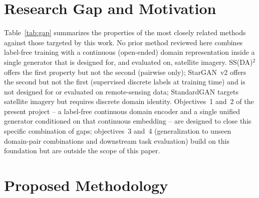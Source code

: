 \documentclass[runningheads]{llncs}
\begin{document}
\section{Research Gap and Motivation}
\label{sec:gap}
Table~\ref{tab:gap} summarizes the properties of the most closely related methods against those targeted by this work. No prior method reviewed here combines label-free training with a continuous (open-ended) domain representation inside a single generator that is designed for, and evaluated on, satellite imagery. SS(DA)$^2$ offers the first property but not the second (pairwise only); StarGAN~v2 offers the second but not the first (supervised discrete labels at training time) and is not designed for or evaluated on remote-sensing data; StandardGAN targets satellite imagery but requires discrete domain identity. Objectives~1 and~2 of the present project -- a label-free continuous domain encoder and a single unified generator conditioned on that continuous embedding -- are designed to close this specific combination of gaps; objectives~3 and~4 (generalization to unseen domain-pair combinations and downstream task evaluation) build on this foundation but are outside the scope of this paper.

\begin{table}[t]
\centering
\caption{Qualitative comparison of properties relevant to the identified research gap.}
\label{tab:gap}
\end{table}

\section{Proposed Methodology}
\end{document}
